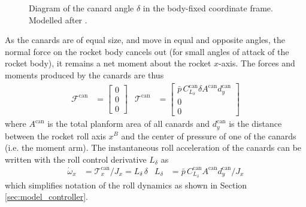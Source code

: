 \begin{figure}[ht]
    \centering
    \resizebox{0.6\textwidth}{!}{
    }
    \caption[Diagram of the canard angle]{Diagram of the canard angle $\delta$ in the body-fixed coordinate frame. Modelled after \cite{siouris2004}.}
    \label{fig:model_delta}
\end{figure}

As the canards are of equal size, and move in equal and opposite angles, the normal force on the rocket body cancels out (for small angles of attack of the rocket body), it remains a net moment about the rocket $x$-axis.
The forces and moments produced by the canards are thus 
\begin{align}
    \mathcal{F}^\text{can} &= \begin{bmatrix} 0 \\ 0 \\ 0 \end{bmatrix}
    & 
    \mathcal{T}^\text{can} &= \begin{bmatrix} \bar p \, C^\text{can}_{L_\delta} \delta A^\text{can} d^\text{can}_y 
    \\ 0 \\ 0 \end{bmatrix} \label{eq:model-aero-canards}
\end{align}
where $A^\text{can}$ is the total planform area of all canards and $d^\text{can}_y$ is the distance between the rocket roll axis $x^B$ and the center of pressure of one of the canards (i.e. the moment arm).
The instantaneous roll acceleration of the canards can be written with the roll control derivative $L_\delta$ as 
\begin{align}
    \dot \omega_x &= \mathcal{T}^\text{can}_x / J_x = L_\delta \, \delta
    & 
    L_\delta &= \bar p \, C^\text{can}_{L_\delta} A^\text{can} d^\text{can}_y / J_x
\end{align}
which simplifies notation of the roll dynamics as shown in Section \ref{sec:model_controller}.

